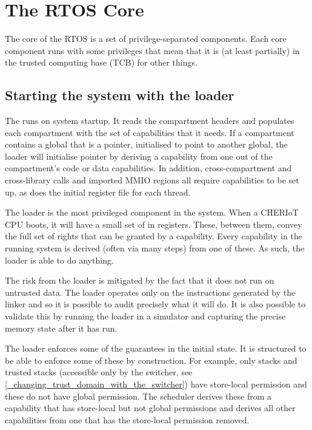 \chapter{The RTOS Core}

The core of the RTOS is a set of privilege-separated components.
Each core component runs with some privileges that mean that it is (at least partially) in the trusted computing base (TCB) for other things.

\section{Starting the system with the loader}

The  runs on system startup.
It reads the compartment headers and populates each compartment with the set of capabilities that it needs.
If a compartment contains a global that is a pointer, initialised to point to another global, the loader will initialise pointer by deriving a capability from one out of the compartment's code or data capabilities.
In addition, cross-compartment and cross-library calls and imported MMIO regions all require capabilities to be set up, as does the initial register file for each thread.

The loader is the most privileged component in the system.
When a CHERIoT CPU boots, it will have a small set of  in registers.
These, between them, convey the full set of rights that can be granted by a capability.
Every capability in the running system is derived (often via many steps) from one of these.
As such, the loader is able to do anything.

The risk from the loader is mitigated by the fact that it does not run on untrusted data.
The loader operates only on the instructions generated by the linker and so it is possible to audit precisely what it will do.
It is also possible to validate this by running the loader in a simulator and capturing the precise memory state after it has run.

The loader enforces some of the guarantees in the initial state.
It is structured to be able to enforce some of these by construction.
For example, only stacks and trusted stacks (accessible only by the switcher, see \ref{_changing_trust_domain_with_the_switcher}) have store-local permission and these do not have global permission.
The scheduler derives these from a capability that has store-local but not global permissions and derives all other capabilities from one that has the store-local permission removed.

